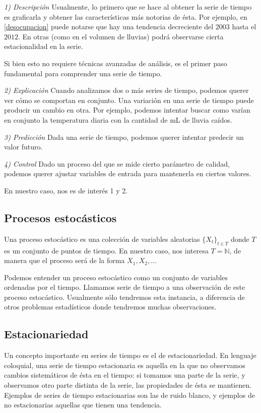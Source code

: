 \emph{1) Descripción} Usualmente, lo primero que se hace al obtener la serie de tiempo es graficarla y obtener las características más notorias de ésta. Por ejemplo, en \ref{desocupacion} puede notarse que hay una tendencia decreciente del $2003$ hasta el $2012$. En otras (como en el volumen de lluvias) podrá observarse cierta estacionalidad en la serie.

Si bien esto no requiere técnicas avanzadas de análisis, es el primer paso fundamental para comprender una serie de tiempo.


\emph{2) Explicación} Cuando analizamos dos o más series de tiempo, podemos querer ver cómo se comportan en conjunto. Una variación en una serie de tiempo puede producir un cambio en otra. Por ejemplo, podemos intentar buscar como varían en conjunto la temperatura diaria con la cantidad de mL de lluvia caídos.

\emph{3) Predicción} Dada una serie de tiempo, podemos querer intentar predecir un valor futuro.

\emph{4) Control} Dado un proceso del que se mide cierto parámetro de calidad, podemos querer ajustar variables de entrada para mantenerla en ciertos valores.

En nuestro caso, nos es de interés 1 y 2.


\subsection{Procesos estocásticos}

\begin{definicion}
Una proceso estocástico es una colección de variables aleatorias $\{X_t \}_{t \in T}$ donde $T$ es un conjunto de puntos de tiempo. En nuestro caso, nos interesa $T = \mathbb{N}$, de manera que el proceso será de la forma $X_1, X_2, \ldots $
\end{definicion}

Podemos entender un proceso estocástico como un conjunto de variables ordenadas por el tiempo. Llamamos serie de tiempo a una observación de este proceso estocástico. Usualmente sólo tendremos esta instancia, a diferencia de otros problemas estadísticos donde tendremos muchas observaciones.


\subsection{Estacionariedad}

Un concepto importante en series de tiempo es el de estacionariedad. En lenguaje coloquial, una serie de tiempo estacionaria es aquella en la que no observamos cambios sistemáticos de ésta en el tiempo: si tomamos una parte de la serie, y observamos otro parte distinta de la serie, las propiedades de ésta se mantienen. Ejemplos de series de tiempo estacionarias son las de ruido blanco, y ejemplos de no estacionarias aquellas que tienen una tendencia.

